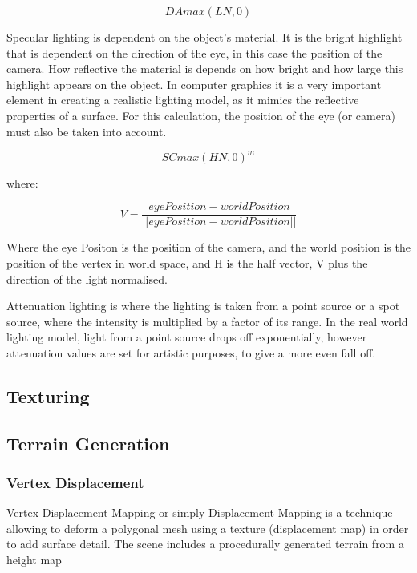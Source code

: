 \documentclass[conference]{acmsiggraph}
\begin{document}
\begin{equation} \label{diffuseLightingEq}
    DA max(L N, 0)
\end{equation}

Specular lighting is dependent on the object's material. It is the bright highlight that is dependent on the direction of the eye, in this case the position of the camera. How reflective the material is depends on how bright and how large this highlight appears on the object. In computer graphics it is a very important element in creating a realistic lighting model, as it mimics the reflective properties of a surface. %
For this calculation, the position of the eye (or camera) must also be taken into account. 

\begin{equation}
    SC max(H N, 0)^m
\end{equation}

where:

\begin{equation} 
    V = \frac{eyePosition - worldPosition}{||eyePosition - worldPosition||}
\end{equation}

Where the eye Positon is the position of the camera, and the world position is the position of the vertex in world space, and H is the half vector, V plus the direction of the light normalised.

Attenuation lighting is where the lighting is taken from a point source or a spot source, where the intensity is multiplied by a factor of its range. In the real world lighting model, light from a point source drops off exponentially, however attenuation values are set for artistic purposes, to give a more even fall off. 

\subsection{Texturing}

\subsection{Terrain Generation}

\subsubsection{Vertex Displacement}

Vertex Displacement Mapping or simply Displacement Mapping is a technique allowing to deform a polygonal mesh using a texture (displacement map) in order to add surface detail. The scene includes a procedurally generated terrain from a height map %
\end{document}
